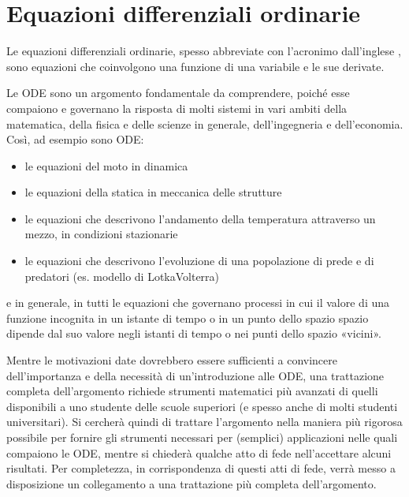\documentclass[letterpaper,10pt,italian]{jupyterBook}
\begin{document}
\section{Equazioni differenziali ordinarie}
\label{\detokenize{ch/ode:equazioni-differenziali-ordinarie}}\label{\detokenize{ch/ode:ode-hs}}\label{\detokenize{ch/ode::doc}}
\sphinxAtStartPar
Le equazioni differenziali ordinarie, spesso abbreviate con l’acronimo  dall’inglese , sono equazioni che coinvolgono una funzione di una variabile e le sue derivate.

\sphinxAtStartPar
{} Le ODE sono un argomento fondamentale da comprendere, poiché esse compaiono e governano la risposta di molti sistemi in vari ambiti della matematica, della fisica e delle scienze in generale, dell’ingegneria e dell’economia. Così, ad esempio sono ODE:
\begin{itemize}
\item {} 
\sphinxAtStartPar
le equazioni del moto in dinamica

\item {} 
\sphinxAtStartPar
le equazioni della statica in meccanica delle strutture

\item {} 
\sphinxAtStartPar
le equazioni che descrivono l’andamento della temperatura attraverso un mezzo, in condizioni stazionarie

\item {} 
\sphinxAtStartPar
le equazioni che descrivono l’evoluzione di una popolazione di prede e di predatori (es. modello di Lotka\sphinxhyphen{}Volterra)

\end{itemize}

\sphinxAtStartPar
e in generale, in tutti le equazioni che governano processi in cui il valore di una funzione incognita in un istante di tempo o in un punto dello spazio spazio dipende dal suo valore negli istanti di tempo o nei punti dello spazio «vicini».

\sphinxAtStartPar
{}
Mentre le motivazioni date dovrebbero essere sufficienti a convincere dell’importanza e della necessità di un’introduzione alle ODE, una trattazione completa dell’argomento richiede strumenti matematici più avanzati di quelli disponibili a uno studente delle scuole superiori (e spesso anche di molti studenti universitari).
Si cercherà quindi di trattare l’argomento nella maniera più rigorosa possibile per fornire gli strumenti necessari per (semplici) applicazioni nelle quali compaiono le ODE, mentre si chiederà qualche atto di fede nell’accettare alcuni risultati. Per completezza, in corrispondenza di questi atti di fede, verrà messo a disposizione un collegamento a una trattazione più completa dell’argomento.
\end{document}
